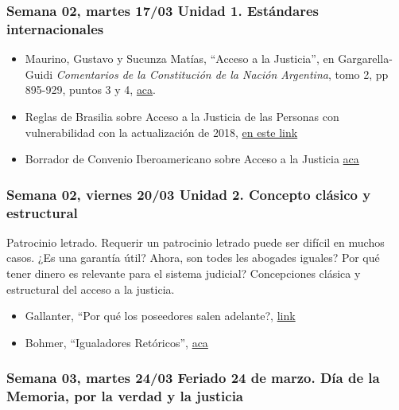 \documentclass[
]{article}
\begin{document}
\subsubsection{Semana 02, martes 17/03 Unidad 1. Estándares
internacionales}\label{semana-02-martes-1703-unidad-1.-estuxe1ndares-internacionales}

\begin{itemize}
\item
  Maurino, Gustavo y Sucunza Matías, ``Acceso a la Justicia'', en
  Gargarella- Guidi \emph{Comentarios de la Constitución de la Nación
  Argentina}, tomo 2, pp 895-929, puntos 3 y 4,
  \href{https://drive.google.com/file/d/1On39ejMciqQNjJIpz1fPseKak_KCjuuF/view?usp=sharing}{aca}.
\item
  Reglas de Brasilia sobre Acceso a la Justicia de las Personas con
  vulnerabilidad con la actualización de 2018,
  \href{https://brasilia100r.com/wp-content/uploads/2020/07/Reglas-de-Brasilia-actualizaci\%C3\%B3n-2018.pdf}{en
  este link}
\item
  Borrador de Convenio Iberoamericano sobre Acceso a la Justicia
  \href{https://drive.google.com/file/d/1ZvhBoVmS245Mt4_mxBN_GJOdlh1jDEL5/view?usp=sharing}{aca}
\end{itemize}

\subsubsection{Semana 02, viernes 20/03 Unidad 2. Concepto clásico y
estructural}\label{semana-02-viernes-2003-unidad-2.-concepto-cluxe1sico-y-estructural}

Patrocinio letrado. Requerir un patrocinio letrado puede ser difícil en
muchos casos. ¿Es una garantía útil? Ahora, son todes les abogades
iguales? Por qué tener dinero es relevante para el sistema judicial?
Concepciones clásica y estructural del acceso a la justicia.

\begin{itemize}
\item
  Gallanter, ``Por qué los poseedores salen adelante?,
  \href{https://drive.google.com/file/d/1Fj3STLmXxHrJglgGgs5JUtDjXy0DSJ3o/view?usp=sharing}{link}
\item
  Bohmer, ``Igualadores Retóricos'',
  \href{https://drive.google.com/file/d/0B50ljTnhr79kMWQ2OTgzYzMtNGNiNS00YjQxLThjYjYtYzg2YWYyNzc0MTlh/view?usp=sharing&resourcekey=0-QzTl1yGSNgnHMOI_ICHjEg}{aca}
\end{itemize}

\subsubsection{\texorpdfstring{{Semana 03, martes 24/03 Feriado 24 de
marzo. Día de la Memoria, por la verdad y la
justicia}}{Semana 03, martes 24/03 Feriado 24 de marzo. Día de la Memoria, por la verdad y la justicia}}\label{semana-03-martes-2403-feriado-24-de-marzo.-duxeda-de-la-memoria-por-la-verdad-y-la-justicia}
\end{document}
